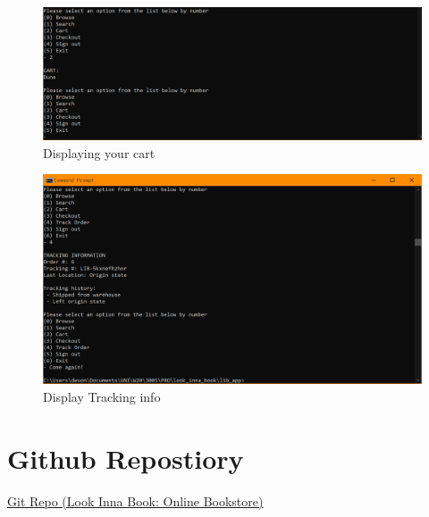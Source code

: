 \documentclass[a4 paper]{article}
\begin{document}
\begin{figure}
\centering 
\includegraphics[width=\textwidth/1]{scenarios_cmd/cart.png}
\caption{Displaying your cart}
\end{figure}
\begin{figure}
\centering 
\includegraphics[width=\textwidth/1]{scenarios_cmd/tracking_disp.png}
\caption{Display Tracking info}
\end{figure}
\section{Github Repostiory}
\href{https://github.com/WalterMitty2112/Online-Bookstore-Webapp}{Git Repo (Look Inna Book: Online Bookstore)}
\end{document}
